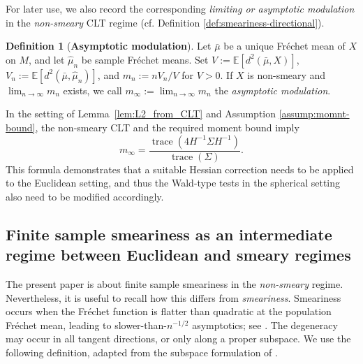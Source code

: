 \documentclass{amsart}
\theoremstyle{definition}
\newtheorem{definition}[theorem]{Definition}
\theoremstyle{remark}
\newcommand{\mubar}{\bar{\mu}}
\newcommand\0{\boldsymbol{0}}
\begin{document}
For later use, we also record the corresponding \textit{limiting or asymptotic modulation} in the \textit{non-smeary} CLT regime (cf. Definition \ref{def:smeariness-directional}).

\begin{definition}[\textbf{Asymptotic modulation}]
\label{def:asymptotic_modulation}
Let \(\mubar\) be a unique Fr\'echet mean of \(X\) on \(M\), and let \(\hat\mu_n\) be sample Fr\'echet means. Set \(V:=\mathbb E[d^2(\mubar,X)]\), \(V_n:=\mathbb E[d^2(\mubar,\hat\mu_n)]\), and \(m_n:=nV_n/V\) for \(V>0\).  If \(X\) is non-smeary and \(\lim_{n\to\infty}m_n\) exists, we call \(m_\infty:=\lim_{n\to\infty}m_n\) the \emph{asymptotic modulation}.
\end{definition}

In the setting of Lemma~\ref{lem:L2_from_CLT} and Assumption \ref{assump:momnt-bound}, the non-smeary CLT and the required moment bound imply
\[
m_\infty=
\frac{\operatorname{trace}(4H^{-1}\Sigma H^{-1})}{\operatorname{trace}(\Sigma)}.
\]
This formula demonstrates that a suitable Hessian correction needs to be applied to the Euclidean setting, and thus the Wald-type tests in the spherical setting also need to be modified accordingly.

\subsection{Finite sample smeariness as an intermediate regime between Euclidean and smeary regimes}
\label{subsec:intro-smeariness}

The present paper is about finite sample smeariness in the \textit{non-smeary} regime.  Nevertheless, it is useful to recall how this differs from \textit{smeariness}.  Smeariness occurs when the Fr\'echet function is flatter than quadratic at the population Fréchet mean, leading to slower-than-\(n^{-1/2}\) asymptotics; see \citet{HotzHuckemann2015,HE,Eltzner2022GeometricalSmeariness}.  The degeneracy may occur in all tangent directions, or only along a proper subspace.  We use the following definition, adapted from the subspace formulation of \citet{Eltzner2022GeometricalSmeariness}.
\end{document}
